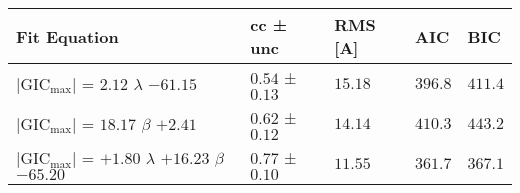 \begin{tabular}{lllll}
\toprule
Fit Equation & cc ± unc & RMS [A] & AIC & BIC \\
\midrule
$\vert{\text{GIC}_\text{max}}\vert$ = $2.12$ $\lambda$ $-61.15$ & $0.54$ ± $0.13$ & $15.18$ & $396.8$ & $411.4$ \\
$\vert{\text{GIC}_\text{max}}\vert$ = $18.17$ $\beta$ $+2.41$ & $0.62$ ± $0.12$ & $14.14$ & $410.3$ & $443.2$ \\
$\vert{\text{GIC}_\text{max}}\vert$ = $+1.80$ $\lambda$ $+16.23$ $\beta$ $-65.20$ & $0.77$ ± $0.10$ & $11.55$ & $361.7$ & $367.1$ \\
\bottomrule
\end{tabular}

